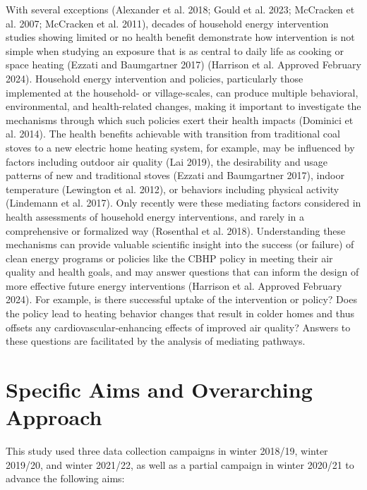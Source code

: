 \documentclass[
  letterpaper,
  DIV=11,
  numbers=noendperiod]{scrartcl}
\begin{document}
With several exceptions (Alexander et al. 2018; Gould et al. 2023;
McCracken et al. 2007; McCracken et al. 2011), decades of household
energy intervention studies showing limited or no health benefit
demonstrate how intervention is not simple when studying an exposure
that is as central to daily life as cooking or space heating (Ezzati and
Baumgartner 2017) (Harrison et al. Approved February 2024). Household
energy intervention and policies, particularly those implemented at the
household- or village-scales, can produce multiple behavioral,
environmental, and health-related changes, making it important to
investigate the mechanisms through which such policies exert their
health impacts (Dominici et al. 2014). The health benefits achievable
with transition from traditional coal stoves to a new electric home
heating system, for example, may be influenced by factors including
outdoor air quality (Lai 2019), the desirability and usage patterns of
new and traditional stoves (Ezzati and Baumgartner 2017), indoor
temperature (Lewington et al. 2012), or behaviors including physical
activity (Lindemann et al. 2017). Only recently were these mediating
factors considered in health assessments of household energy
interventions, and rarely in a comprehensive or formalized way
(Rosenthal et al. 2018). Understanding these mechanisms can provide
valuable scientific insight into the success (or failure) of clean
energy programs or policies like the CBHP policy in meeting their air
quality and health goals, and may answer questions that can inform the
design of more effective future energy interventions (Harrison et al.
Approved February 2024). For example, is there successful uptake of the
intervention or policy? Does the policy lead to heating behavior changes
that result in colder homes and thus offsets any
cardiovascular-enhancing effects of improved air quality? Answers to
these questions are facilitated by the analysis of mediating pathways.

\hypertarget{specific-aims-and-overarching-approach}{%
\section{Specific Aims and Overarching
Approach}\label{specific-aims-and-overarching-approach}}

This study used three data collection campaigns in winter 2018/19,
winter 2019/20, and winter 2021/22, as well as a partial campaign in
winter 2020/21 to advance the following aims:
\end{document}
